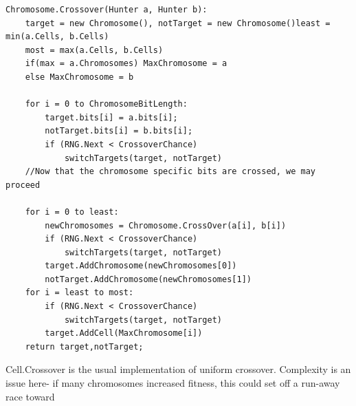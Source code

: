 \begin{minipage}{\linewidth}
\begin{lstlisting}[language = algorithm]
Chromosome.Crossover(Hunter a, Hunter b):
	target = new Chromosome(), notTarget = new Chromosome()least = min(a.Cells, b.Cells)
	most = max(a.Cells, b.Cells)
	if(max = a.Chromosomes) MaxChromosome = a
	else MaxChromosome = b
	
	for i = 0 to ChromosomeBitLength:
		target.bits[i] = a.bits[i];
		notTarget.bits[i] = b.bits[i];
		if (RNG.Next < CrossoverChance)
			switchTargets(target, notTarget)
	//Now that the chromosome specific bits are crossed, we may proceed	
	
	for i = 0 to least:
		newChromosomes = Chromosome.CrossOver(a[i], b[i])
		if (RNG.Next < CrossoverChance)
			switchTargets(target, notTarget)
		target.AddChromosome(newChromosomes[0])
		notTarget.AddChromosome(newChromosomes[1])
	for i = least to most:
		if (RNG.Next < CrossoverChance) 
			switchTargets(target, notTarget)	
		target.AddCell(MaxChromosome[i])
	return target,notTarget;
\end{lstlisting}
\end{minipage}
Cell.Crossover is the usual implementation of uniform crossover.
Complexity is an issue here- if many chromosomes increased fitness, this could set off a run-away race toward